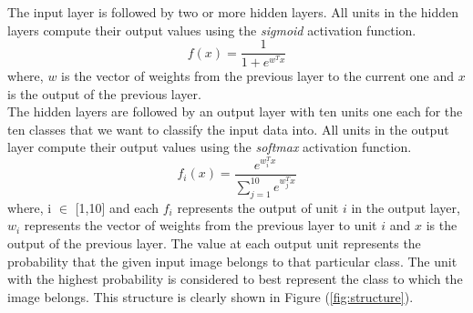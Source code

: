 \documentclass[10pt,twocolumn,letterpaper]{article}
\begin{document}
The input layer is followed by two or more hidden layers. All units in the hidden layers compute their output values using the \textit{sigmoid} activation function. $$f(x) = \frac{1}{1+e^{w^Tx}}$$ where, $w$ is the vector of weights from the previous layer to the current one and $x$ is the output of the previous layer.\\

The hidden layers are followed by an output layer with ten units one each for the ten classes that we want to classify the input data into. All units in the output layer compute their output values using the \textit{softmax} activation function. $$f_i(x) = \frac{e^{w_i^Tx}}{\displaystyle\sum\limits_{j=1}^{10} e^{w_j^Tx}}$$ where, i $\in$ [1,10] and each $f_i$ represents the output of unit $i$ in the output layer, $w_i$ represents the vector of weights from the previous layer to unit $i$ and $x$ is the output of the previous layer. The value at each output unit represents the probability that the given input image belongs to that particular class. The unit with the highest probability is considered to best represent the class to which the image belongs. This structure is clearly shown in Figure (\ref{fig:structure}).
\end{document}
